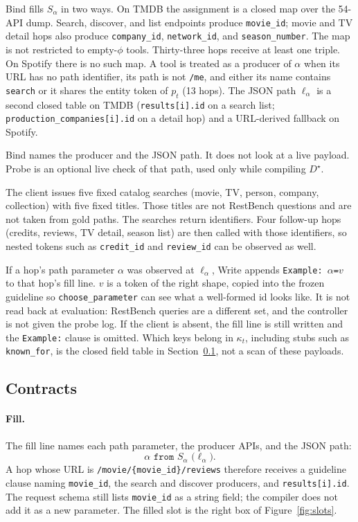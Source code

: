 \documentclass[11pt,a4paper]{article}
\begin{document}
Bind fills $S_\alpha$ in two ways. On TMDB the assignment is a closed map over the 54-API dump. Search, discover, and list endpoints produce \texttt{movie\_id}; movie and TV detail hops also produce \texttt{company\_id}, \texttt{network\_id}, and \texttt{season\_number}. The map is not restricted to empty-$\phi$ tools. Thirty-three hops receive at least one triple. On Spotify there is no such map. A tool is treated as a producer of $\alpha$ when its URL has no path identifier, its path is not \texttt{/me}, and either its name contains \texttt{search} or it shares the entity token of $p_t$ (13 hops). The JSON path $\ell_\alpha$ is a second closed table on TMDB (\texttt{results[i].id} on a search list; \texttt{production\_companies[i].id} on a detail hop) and a URL-derived fallback on Spotify.

Bind names the producer and the JSON path. It does not look at a live payload. Probe is an optional live check of that path, used only while compiling $D^\star$.

The client issues five fixed catalog searches (movie, TV, person, company, collection) with five fixed titles. Those titles are not RestBench questions and are not taken from gold paths. The searches return identifiers. Four follow-up hops (credits, reviews, TV detail, season list) are then called with those identifiers, so nested tokens such as \texttt{credit\_id} and \texttt{review\_id} can be observed as well.

If a hop's path parameter $\alpha$ was observed at $\ell_\alpha$, Write appends \texttt{Example: $\alpha$=$v$} to that hop's fill line. $v$ is a token of the right shape, copied into the frozen guideline so \texttt{choose\_parameter} can see what a well-formed id looks like. It is not read back at evaluation: RestBench queries are a different set, and the controller is not given the probe log. If the client is absent, the fill line is still written and the \texttt{Example:} clause is omitted. Which keys belong in $\kappa_t$, including stubs such as \texttt{known\_for}, is the closed field table in Section~\ref{sec:contracts}, not a scan of these payloads.

\subsection{Contracts}
\label{sec:contracts}

\paragraph{Fill.}
The fill line names each path parameter, the producer APIs, and the JSON path:
\[
\texttt{$\alpha$ from $S_\alpha$ ($\ell_\alpha$)}.
\]
A hop whose URL is \texttt{/movie/\{movie\_id\}/reviews} therefore receives a guideline clause naming \texttt{movie\_id}, the search and discover producers, and \texttt{results[i].id}. The request schema still lists \texttt{movie\_id} as a string field; the compiler does not add it as a new parameter. The filled slot is the right box of Figure~\ref{fig:slots}.
\end{document}
